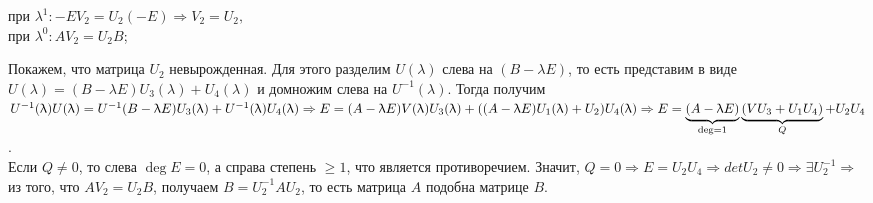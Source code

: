 \begin{Proof}
\begin{center}
		при $\lambda^1 : -EV_2 = U_2(-E)\Rightarrow V_2 = U_2,$\\
		при $\lambda^0 : AV_2 = U_2 B$;
	\end{center}
	Покажем, что матрица $U_2$ невырожденная. Для этого разделим $U(\lambda)$ слева на $(B-\lambda E)$, то есть представим в виде
	$U(\lambda) = (B-\lambda E) U_3(\lambda) + U_4(\lambda)$ и домножим слева на $U^{-1}(\lambda)$. Тогда получим
	$U^{-1}(\lambda)U(\lambda) = U^{-1}(B-\lambda E) U_3(\lambda) + U^{-1}(\lambda)U_4(\lambda)\Rightarrow\\ E = (A-\lambda E)V(\lambda)U_3(\lambda) + ((A-\lambda E) U_1(\lambda) + U_2) U_4(\lambda)\Rightarrow E = \underbrace{(A-\lambda E)}_{\deg =1}\underbrace{(VU_3 + U_1 U_4)}_{Q} + U_2 U_4$.\\ Если $Q\ne 0$, то слева $\deg E = 0$, а справа степень $\geqslant 1$, что является противоречием. Значит, $Q= 0\Rightarrow E = U_2U_4\Rightarrow det U_2 \ne 0\Rightarrow\exists U_2^{-1}\Rightarrow$ из того, что $AV_2 = U_2 B$, получаем $B = U_2^{-1}AU_2$, то есть матрица $A$ подобна матрице $B.$
\end{Proof}






